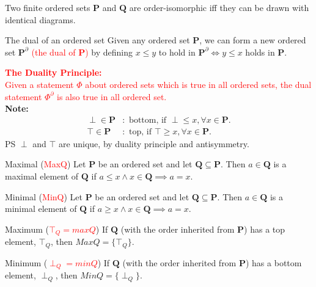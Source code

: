 \begin{proposition}
    Two finite ordered sets $\bm{P}$ and $\bm{Q}$ are order-isomorphic iff they can be drawn with identical diagrams.
\end{proposition}

\begin{definition}{The dual of an ordered set}
    Given any ordered set $\bm{P}$, we can form a new ordered set $\bm{P}^{\partial}$ \textcolor{red}{(the dual of $\bm{P}$)} by defining $x \leq y$ 
    to hold in $\bm{P}^{\partial} \iff y \leq x$ holds in $\bm{P}$.
\end{definition}

\textcolor{red}{\textbf{The Duality Principle:} \\ 
Given a statement $\Phi$ about ordered sets which is true in all ordered sets, the dual statement $\Phi^{\partial}$ is also true in all ordered set.
}
\\

\textbf{Note:}
\begin{align*}
    \perp \in \bm{P} &\colon \text{ bottom, if } \perp \leq x, \forall x \in \bm{P}.\\
    \top \in \bm{P} &\colon \text{ top, if } \top \geq x, \forall x \in \bm{P}.
\end{align*}
PS $\perp$ and $\top$ are unique, by duality principle and antisymmetry.

\begin{definition}{Maximal (\textcolor{red}{MaxQ})}
    Let $\bm{P}$ be an ordered set and let $\bm{Q} \subseteq \bm{P}$.
    Then $a \in \bm{Q}$ is a maximal element of $\bm{Q}$ if $a \leq x \land x \in \bm{Q} \implies a = x$.
\end{definition}
\begin{definition}{Minimal (\textcolor{red}{MinQ})}
    Let $\bm{P}$ be an ordered set and let $\bm{Q} \subseteq \bm{P}$.
    Then $a \in \bm{Q}$ is a minimal element of $\bm{Q}$ if $a \geq x \land x \in \bm{Q} \implies a = x$.
\end{definition}
\begin{definition}{Maximum (\textcolor{red}{$\top_Q = maxQ$})}
    If $\bm{Q}$ (with the order inherited from $\bm{P}$) has a top element, $\top_Q$, then $MaxQ = \{\top_Q\}$.
\end{definition}
\begin{definition}{Minimum (\textcolor{red}{$\perp_Q = minQ$})}
    If $\bm{Q}$ (with the order inherited from $\bm{P}$) has a bottom element, $\perp_Q$, then $MinQ = \{\perp_Q\}$.
\end{definition}